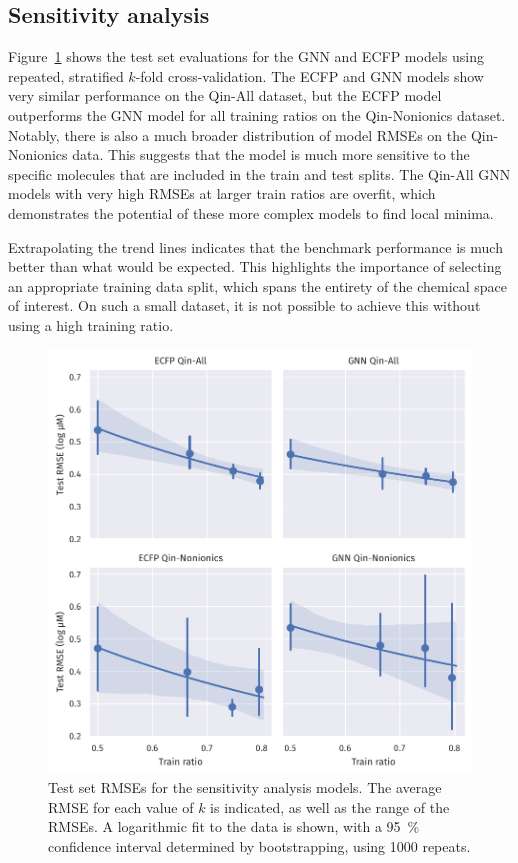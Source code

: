 \subsection{Sensitivity analysis}

Figure~\ref{fig:sensitivity} shows the test set evaluations for the GNN and ECFP
models using repeated, stratified $k$-fold cross-validation. The ECFP and GNN
models show very similar performance on the Qin-All dataset, but the
ECFP model outperforms the GNN model for all training ratios on the
Qin-Nonionics dataset. Notably, there is also a much broader distribution of
model RMSEs on the Qin-Nonionics data. This suggests that the model is much more
sensitive to the specific molecules that are included in the train and test
splits. The Qin-All GNN models with very high RMSEs at larger train ratios are
overfit, which demonstrates the potential of these more complex models to find
local minima.

Extrapolating the trend lines indicates that the benchmark performance is much
better than what would be expected. This highlights the importance of selecting
an appropriate training data split, which spans the entirety of the chemical
space of interest. On such a small dataset, it is not possible to achieve this
without using a high training ratio.

\begin{figure}
    \includegraphics[width=\textwidth]{images/sensitivity-plots.pdf}
    \caption{Test set RMSEs for the sensitivity analysis models. The average
        RMSE for each value of $k$ is indicated, as well as the range of the RMSEs.
        A logarithmic fit to the data is shown, with a \SI{95}{\%} confidence
        interval determined by bootstrapping, using \num{1000} repeats.}
    \label{fig:sensitivity}
\end{figure}